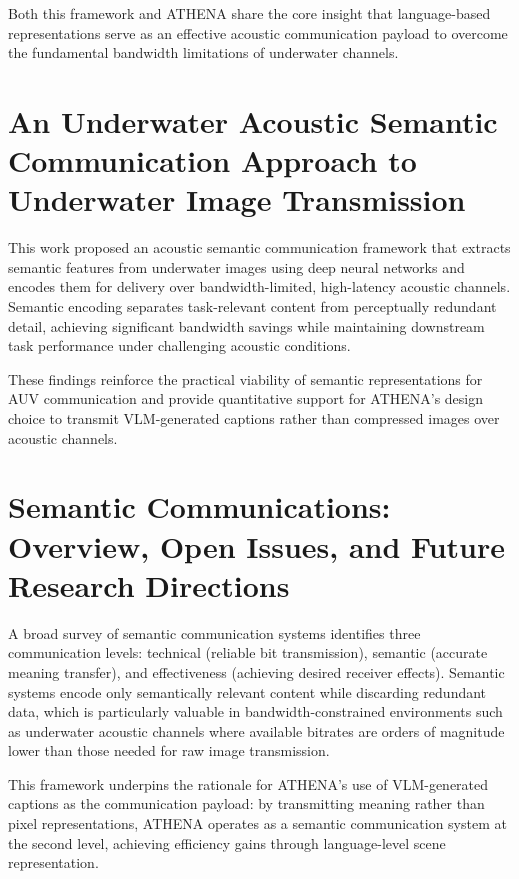 Both this framework and ATHENA share the core insight that language-based representations serve as an effective acoustic communication payload to overcome the fundamental bandwidth limitations of underwater channels.

\section[Zhang et al.]{An Underwater Acoustic Semantic Communication Approach to Underwater Image Transmission~\cite{zhang3}}
This work proposed an acoustic semantic communication framework that extracts semantic features from underwater images using deep neural networks and encodes them for delivery over bandwidth-limited, high-latency acoustic channels. Semantic encoding separates task-relevant content from perceptually redundant detail, achieving significant bandwidth savings while maintaining downstream task performance under challenging acoustic conditions.

These findings reinforce the practical viability of semantic representations for AUV communication and provide quantitative support for ATHENA's design choice to transmit VLM-generated captions rather than compressed images over acoustic channels.

\section[Luo, Chen \& Guo]{Semantic Communications: Overview, Open Issues, and Future Research Directions~\cite{luo2022semantic}}
A broad survey of semantic communication systems identifies three communication levels: technical (reliable bit transmission), semantic (accurate meaning transfer), and effectiveness (achieving desired receiver effects). Semantic systems encode only semantically relevant content while discarding redundant data, which is particularly valuable in bandwidth-constrained environments such as underwater acoustic channels where available bitrates are orders of magnitude lower than those needed for raw image transmission.

This framework underpins the rationale for ATHENA's use of VLM-generated captions as the communication payload: by transmitting meaning rather than pixel representations, ATHENA operates as a semantic communication system at the second level, achieving efficiency gains through language-level scene representation.

